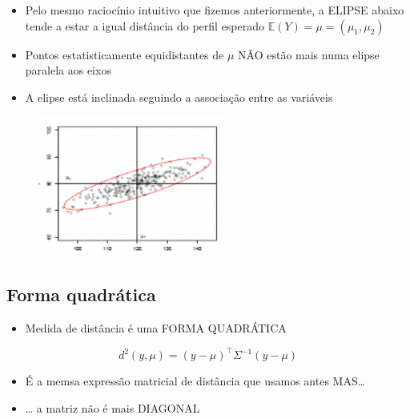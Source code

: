 \documentclass[
  letterpaper,
  DIV=11,
  numbers=noendperiod]{scrartcl}
\providecommand{\tightlist}{%
  \setlength{\itemsep}{0pt}\setlength{\parskip}{0pt}}\usepackage{longtable,booktabs,array}
\begin{document}
\begin{itemize}
\tightlist
\item
  Pelo mesmo raciocínio intuitivo que fizemos anteriormente, a ELIPSE
  abaixo tende a estar a igual distância do perfil esperado
  \(\mathbb E(Y) = \mu = (\mu_1,\mu_2)\)
\item
  Pontos estatisticamente equidistantes de \(\mu\) NÃO estão mais numa
  elipse paralela aos eixos
\item
  A elipse está inclinada seguindo a associação entre as variáveis
\end{itemize}

\begin{figure}

{\centering \includegraphics[width=0.55\textwidth,height=\textheight]{figs/Aula07/caso_mais_realista2.png}

}

\end{figure}

\hypertarget{forma-quadruxe1tica}{%
\subsection{Forma quadrática}\label{forma-quadruxe1tica}}

\begin{itemize}
\tightlist
\item
  Medida de distância é uma FORMA QUADRÁTICA
\end{itemize}

\[ d^2(y,\mu) = (y-\mu)^\top \Sigma^{-1}(y-\mu)\]

\begin{itemize}
\tightlist
\item
  É a memsa expressão matricial de distância que usamos antes
  MAS\ldots{}
\item
  \ldots{} a matriz \sigma não é mais DIAGONAL
\end{itemize}
\end{document}
